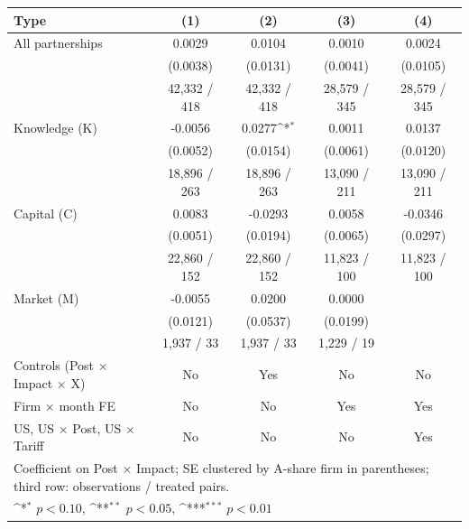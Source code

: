 {
\def\sym#1{\ifmmode^{#1}\else\(^{#1}\)\fi}
\begin{tabular}{lcccc}
\toprule
Type & (1) & (2) & (3) & (4) \\
\midrule
All partnerships & 0.0029 & 0.0104 & 0.0010 & 0.0024 \\
 & (0.0038) & (0.0131) & (0.0041) & (0.0105) \\
 & 42,332 / 418 & 42,332 / 418 & 28,579 / 345 & 28,579 / 345 \\
\addlinespace
Knowledge (K) & -0.0056 & 0.0277\sym{*} & 0.0011 & 0.0137 \\
 & (0.0052) & (0.0154) & (0.0061) & (0.0120) \\
 & 18,896 / 263 & 18,896 / 263 & 13,090 / 211 & 13,090 / 211 \\
\addlinespace
Capital (C) & 0.0083 & -0.0293 & 0.0058 & -0.0346 \\
 & (0.0051) & (0.0194) & (0.0065) & (0.0297) \\
 & 22,860 / 152 & 22,860 / 152 & 11,823 / 100 & 11,823 / 100 \\
\addlinespace
Market (M) & -0.0055 & 0.0200 & 0.0000 &  \\
 & (0.0121) & (0.0537) & (0.0199) &  \\
 & 1,937 / 33 & 1,937 / 33 & 1,229 / 19 &  \\
\midrule
Controls (Post \(\times\) Impact \(\times\) X) & No & Yes & No & No \\
Firm \(\times\) month FE & No & No & Yes & Yes \\
US, US \(\times\) Post, US \(\times\) Tariff & No & No & No & Yes \\
\bottomrule
\multicolumn{5}{l}{\footnotesize Coefficient on Post \(\times\) Impact; SE clustered by A-share firm in parentheses; third row: observations / treated pairs.}\\
\multicolumn{5}{l}{\footnotesize \sym{*} \(p<0.10\), \sym{**} \(p<0.05\), \sym{***} \(p<0.01\)}\\
\end{tabular}
}
